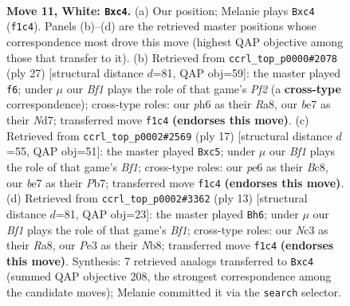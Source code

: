 \documentclass[11pt]{article}
\begin{document}
\clearpage

\begin{figure}[p]\centering
\begin{subfigure}{0.46\textwidth}\centering
\resizebox{\linewidth}{!}{%
\newchessgame
\chessboard[
  setfen={rnbr2k1/pp2bp2/4pn1p/2P3p1/2p5/2N1PNB1/PP3PPP/R3KB1R w KQ - 0 11},
  showmover=false,
  pgfstyle=straightmove, color=movearrow, markmove={f1-c4}
]}
\caption{}
\end{subfigure}\hfill
\begin{subfigure}{0.46\textwidth}\centering
\resizebox{\linewidth}{!}{%
\newchessgame
\chessboard[
  setfen={r3kb1r/p2n1ppp/2N1p3/pBPp1b2/3P4/1P2P3/1P3PPP/R3K2R b KQkq - 0 14},
  showmover=false,
  pgfstyle=straightmove, color=movearrow, markmove={f7-f6}
]}
\caption{}
\end{subfigure}
\\[4pt]
\begin{subfigure}{0.46\textwidth}\centering
\resizebox{\linewidth}{!}{%
\newchessgame
\chessboard[
  setfen={r1b1kb1r/1p3ppp/p1n1pn2/2P5/2B5/4PN1P/PP3PP1/RNBR2K1 b kq - 0 9},
  showmover=false,
  pgfstyle=straightmove, color=movearrow, markmove={f8-c5}
]}
\caption{}
\end{subfigure}\hfill
\begin{subfigure}{0.46\textwidth}\centering
\resizebox{\linewidth}{!}{%
\newchessgame
\chessboard[
  setfen={rnb1kb1r/pp2pp1p/5np1/2p5/4PP2/2PB4/PP4PP/RNBK2NR b kq - 2 7},
  showmover=false,
  pgfstyle=straightmove, color=movearrow, markmove={f8-h6}
]}
\caption{}
\end{subfigure}
\caption{\textbf{Move 11, White: \texttt{Bxc4}.} (a) Our position; Melanie plays \texttt{Bxc4} (\texttt{f1c4}). Panels (b)--(d) are the retrieved master positions whose correspondence most drove this move (highest QAP objective among those that transfer to it). (b) Retrieved from \texttt{ccrl\_top\_p0000\#2078} (ply 27) [structural distance $d$=81, QAP obj=59]: the master played \texttt{f6}; under $\mu$ our \emph{Bf1} plays the role of that game's \emph{Pf2} (a \textbf{cross-type} correspondence); cross-type roles: our \emph{p}h6 as their \emph{R}a8, our \emph{b}e7 as their \emph{N}d7; transferred move \texttt{f1c4} \textbf{(endorses this move)}. (c) Retrieved from \texttt{ccrl\_top\_p0002\#2569} (ply 17) [structural distance $d$=55, QAP obj=51]: the master played \texttt{Bxc5}; under $\mu$ our \emph{Bf1} plays the role of that game's \emph{Bf1}; cross-type roles: our \emph{p}e6 as their \emph{B}c8, our \emph{b}e7 as their \emph{P}b7; transferred move \texttt{f1c4} \textbf{(endorses this move)}. (d) Retrieved from \texttt{ccrl\_top\_p0002\#3362} (ply 13) [structural distance $d$=81, QAP obj=23]: the master played \texttt{Bh6}; under $\mu$ our \emph{Bf1} plays the role of that game's \emph{Bf1}; cross-type roles: our \emph{N}c3 as their \emph{R}a8, our \emph{P}e3 as their \emph{N}b8; transferred move \texttt{f1c4} \textbf{(endorses this move)}. Synthesis: 7 retrieved analogs transferred to \texttt{Bxc4} (summed QAP objective 208, the strongest correspondence among the candidate moves); Melanie committed it via the \texttt{search} selector.}
\label{fig:thought-m20}
\end{figure}
\end{document}
